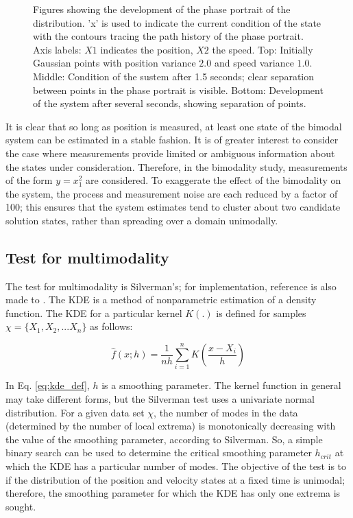 \documentclass[]{article}
\begin{document}
\begin{figure}[p!]
\caption{Figures showing the development of the phase portrait of the distribution. 'x' is used to indicate the current condition of the state with the contours tracing the path history of the phase portrait. Axis labels: $X1$ indicates the position, $X2$ the speed. Top: Initially Gaussian points with position variance $2.0$ and speed variance $1.0$. Middle: Condition of the sustem after 1.5 seconds; clear separation between points in the phase portrait is visible. Bottom: Development of the system after several seconds, showing separation of points.}
\label{fig:bifurcation_animate_1}
\end{figure}

It is clear that so long as position is measured, at least one state of the bimodal system can be estimated in a stable fashion. It is of greater interest to consider the case where measurements provide limited or ambiguous information about the states under consideration. Therefore, in the bimodality study, measurements of the form $y = x_1^2$ are considered. To exaggerate the effect of the bimodality on the system, the process and measurement noise are each reduced by a factor of 100; this ensures that the system estimates tend to cluster about two candidate solution states, rather than spreading over a domain unimodally.


\subsection{Test for multimodality}

The test for multimodality is Silverman's\cite{silverman}; for implementation, reference is also made to \cite{adereth}. The KDE is a method of nonparametric estimation of a density function. The KDE for a particular kernel $K(.)$ is defined for samples $\chi = \{ X_1,X_2,...X_n \}$ as follows:

\begin{equation}
\hat{f}(x;h) = \frac{1}{nh} \sum_{i=1}^{n} K(\frac{x-X_i}{h})
\label{eq:kde_def}
\end{equation}

In Eq. \ref{eq:kde_def}, $h$ is a smoothing parameter. The kernel function in general may take different forms, but the Silverman test uses a univariate normal distribution. For a given data set $\chi$, the number of modes in the data (determined by the number of local extrema) is monotonically decreasing with the value of the smoothing parameter, according to Silverman\cite{silverman}. So, a simple binary search can be used to determine the critical smoothing parameter $h_{crit}$ at which the KDE has a particular number of modes. The objective of the test is to if the distribution of the position and velocity states at a fixed time is unimodal; therefore, the smoothing parameter for which the KDE has only one extrema is sought.
\end{document}
